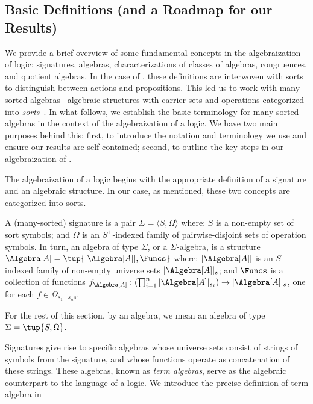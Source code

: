 \subsection{Basic Definitions (and a Roadmap for our Results)}\label{section:basics}

We provide a brief overview of some fundamental concepts in the algebraization of logic: signatures, algebras, characterizations of classes of algebras, congruences, and quotient algebras. In the case of \DAL, these definitions are interwoven with sorts to distinguish between actions and propositions.
This led us to work with many-sorted algebras --algebraic structures with carrier sets and operations categorized into \emph{sorts}~\cite{Halmos:2009,Tarlecki:2012}. In what follows, we establish the basic terminology for many-sorted algebras in the context of the algebraization of a logic. We have two main purposes behind this: first, to introduce the notation and terminology we use and ensure our results are self-contained; second, to outline the key steps in our algebraization of \DAL.

The algebraization of a logic begins with the appropriate definition of a signature and an algebraic structure. In our case, as mentioned, these two concepts are categorized into sorts.

\medskip
\begin{definition}
	A (many-sorted) signature is a pair $\Sigma = \langle S, \Omega \rangle$ where:
		$S$ is a non-empty set of sort symbols;
		and
		$\Omega$ is an $S^{+}$-indexed family of pairwise-disjoint sets of operation symbols. %
	In turn, an algebra of type $\Sigma$, or a $\Sigma$-algebra, is a structure $\Algebra[A] = \tup{|\Algebra[A]|, \Funcs}$ where:
		$|\Algebra[A]|$ is an $S$-indexed family of non-empty universe sets $|\Algebra[A]|_s$; and
		$\Funcs$ is a collection of functions ${f_{\Algebra[A]}: (\prod_{i = 1}^{n} |\Algebra[A]|_{s_i}) \to |\Algebra[A]|_{s}}$, one for each $f \in \Omega_{s_1 \dots s_n s}$.
\end{definition}
\medskip

For the rest of this section, by an algebra, we mean an algebra of type $\Sigma = \tup{S, \Omega}$.

Signatures give rise to specific algebras whose universe sets consist of strings of symbols from the signature, and whose functions operate as concatenation of these strings. These algebras, known as \emph{term algebras}, serve as the algebraic counterpart to the language of a logic.
We introduce the precise definition of term algebra in 

